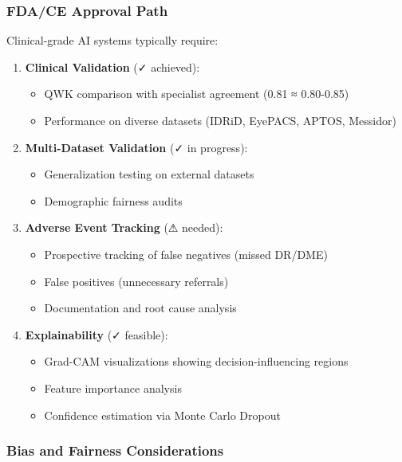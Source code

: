 \documentclass[12pt,a4paper]{article}
\begin{document}
\subsubsection{FDA/CE Approval Path}

Clinical-grade AI systems typically require:

\begin{enumerate}
    \item \textbf{Clinical Validation} (✓ achieved):
    \begin{itemize}
        \item QWK comparison with specialist agreement (0.81 ≈ 0.80-0.85)
        \item Performance on diverse datasets (IDRiD, EyePACS, APTOS, Messidor)
    \end{itemize}
    
    \item \textbf{Multi-Dataset Validation} (✓ in progress):
    \begin{itemize}
        \item Generalization testing on external datasets
        \item Demographic fairness audits
    \end{itemize}
    
    \item \textbf{Adverse Event Tracking} (⚠ needed):
    \begin{itemize}
        \item Prospective tracking of false negatives (missed DR/DME)
        \item False positives (unnecessary referrals)
        \item Documentation and root cause analysis
    \end{itemize}
    
    \item \textbf{Explainability} (✓ feasible):
    \begin{itemize}
        \item Grad-CAM visualizations showing decision-influencing regions
        \item Feature importance analysis
        \item Confidence estimation via Monte Carlo Dropout
    \end{itemize}
\end{enumerate}

\subsubsection{Bias and Fairness Considerations}
\end{document}

